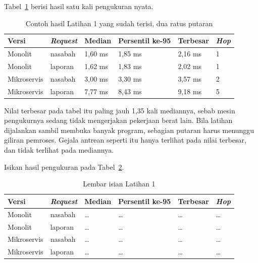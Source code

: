 Tabel~\ref{tab:lat1mikro-contoh} berisi hasil satu kali pengukuran nyata.

\begin{table}[htbp]
  \centering
  \caption{Contoh hasil Latihan 1 yang sudah terisi, dua ratus putaran}
  \label{tab:lat1mikro-contoh}
  \begin{tabularx}{\textwidth}{|l|X|l|l|l|l|}
    \hline
    \textbf{Versi} & \textbf{\textit{Request}} & \textbf{Median} & \textbf{Persentil ke-95} & \textbf{Terbesar} & \textbf{\textit{Hop}} \\
    \hline
    Monolit & nasabah & 1,60 ms & 1,85 ms & 2,16 ms & 1 \\
    \hline
    Monolit & laporan & 1,62 ms & 1,83 ms & 2,02 ms & 1 \\
    \hline
    Mikroservis & nasabah & 3,00 ms & 3,30 ms & 3,57 ms & 2 \\
    \hline
    Mikroservis & laporan & 7,77 ms & 8,43 ms & 9,18 ms & 5 \\
    \hline
  \end{tabularx}
\end{table}

Nilai terbesar pada tabel itu paling jauh 1,35 kali mediannya, sebab mesin
pengukurnya sedang tidak mengerjakan pekerjaan berat lain. Bila latihan
dijalankan sambil membuka banyak program, sebagian putaran harus menunggu
giliran pemroses. Gejala antrean seperti itu hanya terlihat pada nilai
terbesar, dan tidak terlihat pada mediannya.

Isikan hasil pengukuran pada Tabel~\ref{tab:lat1mikro-hasil}.

\begin{table}[htbp]
  \centering
  \caption{Lembar isian Latihan 1}
  \label{tab:lat1mikro-hasil}
  \begin{tabularx}{\textwidth}{|l|X|l|l|l|l|}
    \hline
    \textbf{Versi} & \textbf{\textit{Request}} & \textbf{Median} & \textbf{Persentil ke-95} & \textbf{Terbesar} & \textbf{\textit{Hop}} \\
    \hline
    Monolit & nasabah & \dots & \dots & \dots & \dots \\
    \hline
    Monolit & laporan & \dots & \dots & \dots & \dots \\
    \hline
    Mikroservis & nasabah & \dots & \dots & \dots & \dots \\
    \hline
    Mikroservis & laporan & \dots & \dots & \dots & \dots \\
    \hline
  \end{tabularx}
\end{table}

